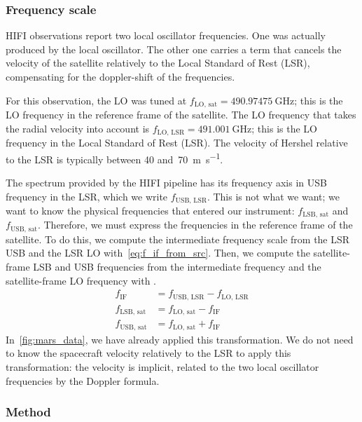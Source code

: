 \subsubsection{Frequency scale}

HIFI observations report two local oscillator frequencies.
One was actually produced by the local oscillator.
The other one carries a term that cancels the velocity of the satellite relatively to the Local Standard of Rest (LSR), compensating for the doppler-shift of the frequencies.

For this observation, the LO was tuned at
$f_\text{LO, sat} = \SI{490.97475}{\giga\hertz}$;
this is the LO frequency in the reference frame of the satellite.
The LO frequency that takes the radial velocity into account is
$f_\text{LO, LSR} = \SI{491.001}{\giga\hertz}$;
this is the LO frequency in the Local Standard of Rest (LSR).
The velocity of Hershel relative to the LSR is typically between \num{40} and~\SI{70}{\meter\per\second}.

The spectrum provided by the HIFI pipeline has its frequency axis in USB frequency in the LSR, which we write $f_\text{USB, LSR}$.
This is not what we want; we want to know the physical frequencies that entered our instrument: $f_\text{LSB, sat}$ and $f_\text{USB, sat}$.
Therefore, we must express the frequencies in the reference frame of the satellite.
To do this, we compute the intermediate frequency scale from the LSR USB and the LSR LO with~\cref{eq:f_if_from_src}.
Then, we compute the satellite-frame LSB and USB frequencies from the intermediate frequency and the satellite-frame LO frequency with .
\begin{align}
    f_\text{IF} &= f_\text{USB, LSR} - f_\text{LO, LSR} \label{eq:f_if_from_src} \\
    f_\text{LSB, sat} &= f_\text{LO, sat} - f_\text{IF} \label{eq:f_lsb_sat}\\
    f_\text{USB, sat} &= f_\text{LO, sat} + f_\text{IF} \label{eq:f_usb_sat}
\end{align}
In~\cref{fig:mars_data}, we have already applied this transformation.
We do not need to know the spacecraft velocity relatively to the LSR to apply this transformation: the velocity is implicit, related to the two local oscillator frequencies by the Doppler formula.


\subsubsection{Method}

